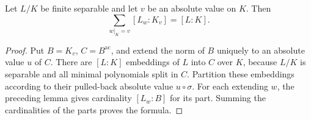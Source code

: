 \begin{theorem}\label{thm:local-degree-sum}
\leanok
{}
Let $L/K$ be finite separable and let $v$ be an absolute value on $K$.
Then
\[
 \sum_{w|_K=v}[L_w:K_v]=[L:K].
\]
\end{theorem}
\begin{proof}
Put $B=K_v$, $C=B^{\mathrm{ac}}$, and extend the norm of $B$ uniquely
to an absolute value $u$ of $C$. There are $[L:K]$ embeddings of $L$
into $C$ over $K$, because $L/K$ is separable and all minimal polynomials
split in $C$. Partition these embeddings according to their pulled-back
absolute value $u\circ\sigma$. For each extending $w$, the preceding
lemma gives cardinality $[L_w:B]$ for its part. Summing the cardinalities of the
parts proves the formula.
\end{proof}


